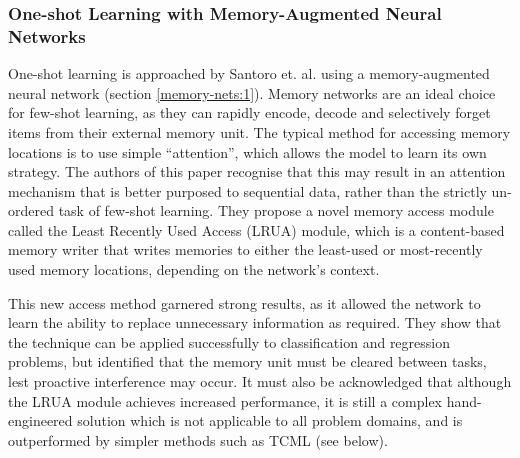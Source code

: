 \documentclass{report}
\begin{document}
	\subsubsection{One-shot Learning with Memory-Augmented Neural Networks}
	One-shot learning is approached by Santoro et. al. \parencite{oslwmann} using a memory-augmented neural network (section \ref{memory-nets:1}). Memory networks are an ideal choice for few-shot learning, as they can rapidly encode, decode and selectively forget items from their external memory unit. The typical method for accessing memory locations is to use simple ``attention'', which allows the model to learn its own strategy. The authors of this paper recognise that this may result in an attention mechanism that is better purposed to sequential data, rather than the strictly un-ordered task of few-shot learning. They propose a novel memory access module called the Least Recently Used Access (LRUA) module, which is a content-based memory writer that writes memories to either the least-used or most-recently used memory locations, depending on the network's context. \par
	This new access method garnered strong results, as it allowed the network to learn the ability to replace unnecessary information as required. They show that the technique can be applied successfully to classification and regression problems, but identified that the memory unit must be cleared between tasks, lest proactive interference may occur. It must also be acknowledged that although the LRUA module achieves increased performance, it is still a complex hand-engineered solution which is not applicable to all problem domains, and is outperformed by simpler methods such as TCML (see below).  \par
	
\end{document}
